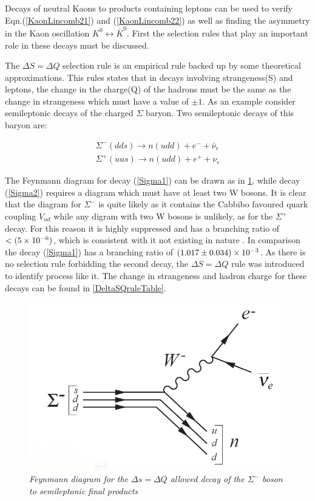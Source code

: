 Decays of neutral Kaons to products containing leptons can be used to verify Eqn.(\ref{KaonLincomb21}) and (\ref{KaonLincomb22}) as well as finding the asymmetry in the Kaon oscillation $K^{0} \leftrightarrow \bar{K}^{0}$. First the selection rules that play an important role in these decays must be discussed.

The $\Delta S = \Delta Q$ selection rule is an empirical rule backed up by some theoretical approximations. This rules states that in decays involving strangeness(S) and leptons, the change in the charge(Q) of the hadrons must be the same as the change in strangeness which must have a value of $\pm 1$. As an example consider semileptonic decays of the charged $\Sigma$ baryon. Two semileptonic decays of this baryon are:

\begin{align}
\label{Sigma1}
\Sigma^{-} (dds) \rightarrow n(udd) + e^{-} + \bar{\nu}_{e} \\
\label{Sigma2}
\Sigma^{+} (uus) \rightarrow n(udd) + e^{+} + \nu_{e}
\end{align}  

\noindent The Feynmann diagram for decay (\ref{Sigma1}) can be drawn as in \cref{KevFeyn2}, while decay (\ref{Sigma2}) requires a diagram which must have at least two W bosons. It is clear that the diagram for $\Sigma^{-}$ is quite likely as it contains the Cabbibo favoured quark coupling $V_{ud}$ while any digram with two W bosons is unlikely, as for the $\Sigma^{+}$ decay. For this reason it is highly suppressed and has a branching ratio of $< (5\times 10^{-6})$, which is consistent with it not existing in nature \cite{PDGKaons}. In comparison the decay (\ref{Sigma1}) has a branching ratio of $(1.017 \pm 0.034) \times 10^{-3}$. As there is no selection rule forbidding the second decay, the $\Delta S = \Delta Q$ rule was introduced to identify process like it. The change in strangeness and hadron charge for these decays can be found in \cref{DeltaSQruleTable}.

\begin{figure}[h!]
\begin{center}
\includegraphics[scale=0.4]{figs/KevFeyn2.png}
\end{center}
\caption{\textit{Feynmann diagram for the $\Delta s = \Delta Q$ allowed decay of the $\Sigma^{-}$ boson to semileptonic final products}}
\label{KevFeyn2}
\end{figure}

